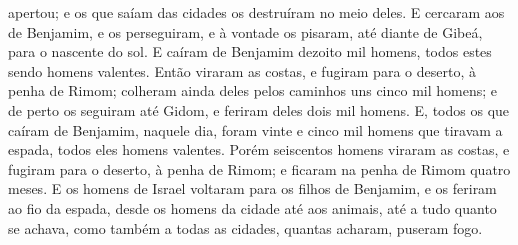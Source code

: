 apertou; e os que saíam das cidades os destruíram no meio deles.
E cercaram aos de Benjamim, e os perseguiram, e à vontade os
pisaram, até diante de Gibeá, para o nascente do sol. E
caíram de Benjamim dezoito mil homens, todos estes sendo homens
valentes. Então viraram as costas, e fugiram para o deserto,
à penha de Rimom; colheram ainda deles pelos caminhos uns cinco mil
homens; e de perto os seguiram até Gidom, e feriram deles dois mil
homens. E, todos os que caíram de Benjamim, naquele dia,
foram vinte e cinco mil homens que tiravam a espada, todos eles
homens valentes. Porém seiscentos homens viraram as costas, e
fugiram para o deserto, à penha de Rimom; e ficaram na penha de
Rimom quatro meses. E os homens de Israel voltaram para os
filhos de Benjamim, e os feriram ao fio da espada, desde os homens
da cidade até aos animais, até a tudo quanto se achava, como também
a todas as cidades, quantas acharam, puseram fogo.

\medskip

